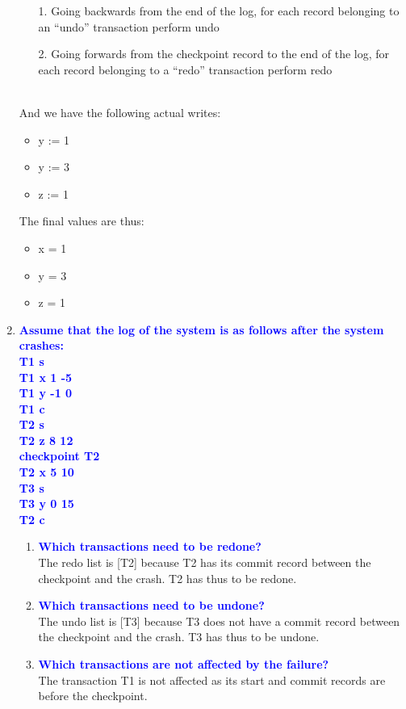 \documentclass[10pt]{article}
\begin{document}
\begin{enumerate}
    \begin{itemize}
        \item [1.] Going backwards from the end of the log, for each record belonging to an “undo” transaction perform undo
        \item [2.] Going forwards from the checkpoint record to the end of the log, for each record belonging to a “redo” transaction perform redo
    \end{itemize}
    \\ And we have the following actual writes:
    \begin{itemize}
        \item y := 1
        \item y := 3
        \item z := 1
    \end{itemize}
    The final values are thus:
    \begin{itemize}
        \item x = 1
        \item y = 3
        \item z = 1
    \end{itemize}

\item \textbf{\textcolor{blue}{Assume that the log of the system is as follows after the system crashes:
\\ T1 s
\\ T1 x 1 -5
\\ T1 y -1 0
\\ T1 c
\\ T2 s
\\ T2 z 8 12
\\ checkpoint T2
\\ T2 x 5 10
\\ T3 s
\\ T3 y 0 15
\\ T2 c}}
    \begin{enumerate}
        \item \textbf{\textcolor{blue}{Which transactions need to be redone?}}
            \\ The redo list is [T2] because T2 has its commit record between the checkpoint and the crash. T2 has thus to be redone.
        \item \textbf{\textcolor{blue}{Which transactions need to be undone?}}
            \\ The undo list is [T3] because T3 does not have a commit record between the checkpoint and the crash. T3 has thus to be undone.
        \item \textbf{\textcolor{blue}{Which transactions are not affected by the failure?}}
            \\ The transaction T1 is not affected as its start and commit records are before the checkpoint.
    \end{enumerate}
\end{enumerate}
\end{document}
